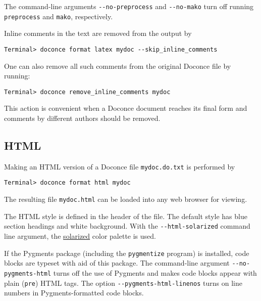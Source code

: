 \documentclass[twoside]{article}
\begin{document}
The command-line arguments {\fontsize{10pt}{10pt}\verb!--no-preprocess!} and {\fontsize{10pt}{10pt}\verb!--no-mako!} turn off
running {\fontsize{10pt}{10pt}\verb!preprocess!} and {\fontsize{10pt}{10pt}\verb!mako!}, respectively.

Inline comments in the text are removed from the output by
\vspace{4pt}
\begin{Verbatim}[numbers=none,frame=lines,label=\fbox{{\tiny Terminal}},fontsize=\fontsize{9pt}{9pt},
labelposition=topline,framesep=2.5mm,framerule=0.7pt]
Terminal> doconce format latex mydoc --skip_inline_comments
\end{Verbatim}
One can also remove all such comments from the original Doconce
file by running:
\begin{Verbatim}[fontsize=\fontsize{9pt}{9pt},tabsize=8,baselinestretch=0.85,
fontfamily=tt,xleftmargin=7mm]
Terminal> doconce remove_inline_comments mydoc
\end{Verbatim}
\noindent
This action is convenient when a Doconce document reaches its final form
and comments by different authors should be removed.

\subsection{HTML}

Making an HTML version of a Doconce file {\fontsize{10pt}{10pt}\verb!mydoc.do.txt!}
is performed by
\vspace{4pt}
\begin{Verbatim}[numbers=none,frame=lines,label=\fbox{{\tiny Terminal}},fontsize=\fontsize{9pt}{9pt},
labelposition=topline,framesep=2.5mm,framerule=0.7pt]
Terminal> doconce format html mydoc
\end{Verbatim}
The resulting file {\fontsize{10pt}{10pt}\verb!mydoc.html!} can be loaded into any web browser for viewing.

The HTML style is defined in the header of the file. The default style
has blue section headings and white background. With the {\fontsize{10pt}{10pt}\verb!--html-solarized!}
command line argument, the \href{{http://ethanschoonover.com/solarized}}{solarized}
color palette is used.

If the Pygments package (including the {\fontsize{10pt}{10pt}\verb!pygmentize!} program)
is installed, code blocks are typeset with
aid of this package. The command-line argument {\fontsize{10pt}{10pt}\verb!--no-pygments-html!}
turns off the use of Pygments and makes code blocks appear with
plain ({\fontsize{10pt}{10pt}\verb!pre!}) HTML tags. The option {\fontsize{10pt}{10pt}\verb!--pygments-html-linenos!} turns
on line numbers in Pygments-formatted code blocks.
\end{document}
